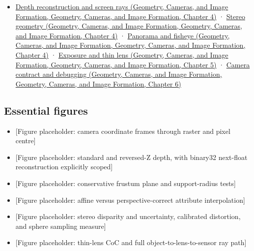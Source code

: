 \begin{itemize}
\tightlist
\item
  \href{../03-Geometry-Cameras-and-Image-Formation/main.pdf\#nameddest=02-foundations-ii-ch035-recover-geometry-from-depth-and-construct-screen-space-rays}{Depth reconstruction and screen rays (Geometry, Cameras, and Image Formation, Geometry, Cameras, and Image Formation, Chapter 4)} · \href{../03-Geometry-Cameras-and-Image-Formation/main.pdf\#nameddest=02-foundations-ii-ch035-build-projection-and-stereo-geometry-around-real-camera-baselines}{Stereo geometry (Geometry, Cameras, and Image Formation, Geometry, Cameras, and Image Formation, Chapter 4)} · \href{../03-Geometry-Cameras-and-Image-Formation/main.pdf\#nameddest=02-foundations-ii-ch035-represent-directions-over-the-full-sphere}{Panorama and fisheye (Geometry, Cameras, and Image Formation, Geometry, Cameras, and Image Formation, Chapter 4)} · \href{../03-Geometry-Cameras-and-Image-Formation/main.pdf\#nameddest=02-foundations-ii-ch036-model-exposure-physical-optics-and-depth-of-field}{Exposure and thin lens (Geometry, Cameras, and Image Formation, Geometry, Cameras, and Image Formation, Chapter 5)} · \href{../03-Geometry-Cameras-and-Image-Formation/main.pdf\#nameddest=02-foundations-ii-ch037-make-camera-conventions-explicit-and-debug-the-full-transform-chain}{Camera contract and debugging (Geometry, Cameras, and Image Formation, Geometry, Cameras, and Image Formation, Chapter 6)}
\end{itemize}

\subsection{Essential figures}\label{appendix-a2b71a18f5a2-essential-figures}

\begin{itemize}
\tightlist
\item
  {[}Figure placeholder: camera coordinate frames through raster and pixel centre{]}
\item
  {[}Figure placeholder: standard and reversed-Z depth, with binary32 next-float reconstruction explicitly scoped{]}
\item
  {[}Figure placeholder: conservative frustum plane and support-radius tests{]}
\item
  {[}Figure placeholder: affine versus perspective-correct attribute interpolation{]}
\item
  {[}Figure placeholder: stereo disparity and uncertainty, calibrated distortion, and sphere sampling measure{]}
\item
  {[}Figure placeholder: thin-lens CoC and full object-to-lens-to-sensor ray path{]}
\end{itemize}

